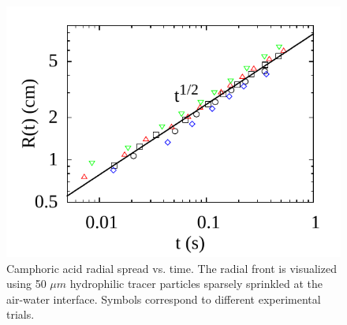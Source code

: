 \documentclass[journal=langd5, manuscript=article, layout=twocolumn]{achemso}
\begin{document}
\begin{figure}[ht]
    \begin{center}
       \includegraphics[width=\linewidth]{rvst_transient.pdf}
    \end{center}
    \caption{Camphoric acid radial spread vs. time. The radial front is visualized using 50 $\mu m$ hydrophilic tracer particles sparsely sprinkled at the air-water interface. Symbols correspond to different experimental trials.}
    \label{fig:caspread}
\end{figure}
\end{document}
